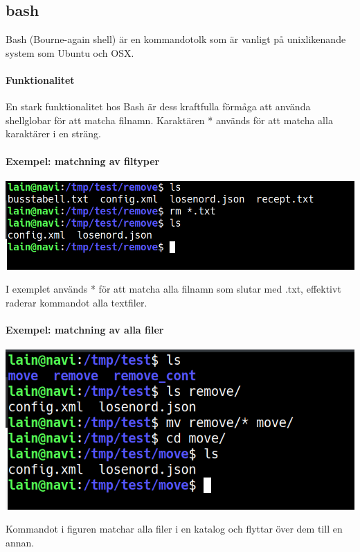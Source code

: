 \subsection{bash}
Bash (Bourne-again shell) är en kommandotolk som är vanligt på unixlikenande system som Ubuntu och OSX. 
\paragraph{Funktionalitet}
En stark funktionalitet hos Bash är dess kraftfulla förmåga att använda shellglobar för att matcha filnamn. Karaktären * används för att matcha alla karaktärer i en sträng.
\paragraph{Exempel: matchning av filtyper}
\begin{center}
        \includegraphics[width=\linewidth]{bilder/bash_remove_filetype.png}
\end{center}
I exemplet används * för att matcha alla filnamn som slutar med .txt, effektivt raderar kommandot alla textfiler.
\paragraph{Exempel: matchning av alla filer}
\begin{center}
        \includegraphics[width=\linewidth]{bilder/bash_move_files.png}
\end{center}
Kommandot i figuren matchar alla filer i en katalog och flyttar över dem till en annan.
